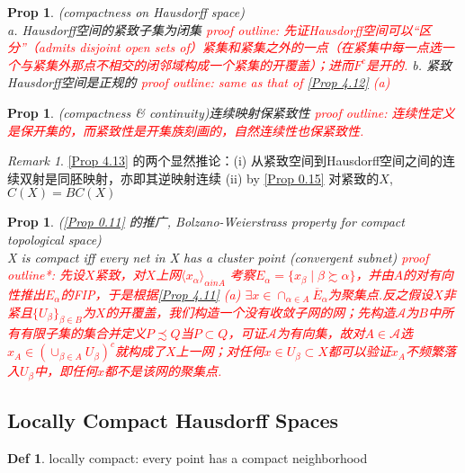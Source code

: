 \documentclass[hidelinks]{article}
\theoremstyle{definition}
\newtheorem*{defin}{Def}
\theoremstyle{plain}
\newtheorem{proposition}[theorem]{Prop}
\theoremstyle{remark}
\newtheorem*{remark}{Remark}
\begin{document}
\begin{proposition}\label{Prop 4.12}(compactness on Hausdorff space)~\\
a. Hausdorff空间的紧致子集为闭集\newline
\textcolor{red}{proof outline: 先证Hausdorff空间可以“区分”（admits disjoint open sets of）紧集和紧集之外的一点（在紧集中每一点选一个与紧集外那点不相交的闭邻域构成一个紧集的开覆盖）；进而$F^c$是开的.} \newline
b. 紧致Hausdorff空间是正规的 \newline
\textcolor{red}{proof outline: same as that of \autoref{Prop 4.12} (a)}
\end{proposition}

\begin{proposition}(compactness \& continuity)\label{Prop 4.13}
连续映射保紧致性\newline
\textcolor{red}{proof outline: 连续性定义是保开集的，而紧致性是开集族刻画的，自然连续性也保紧致性.}
\end{proposition}

\begin{remark}
\autoref{Prop 4.13} 的两个显然推论：(i) 从紧致空间到Hausdorff空间之间的连续双射是同胚映射，亦即其逆映射连续 (ii) by \autoref{Prop 0.15} 对紧致的$X$, $C(X)=BC(X)$
\end{remark}

\begin{proposition} (\autoref{Prop 0.11} 的推广, Bolzano-Weierstrass property for compact topological space)~\\
X is compact iff every net in X has a cluster point (convergent subnet) \newline
\textcolor{red}{proof outline*: 先设$X$紧致，对$X$上网$\langle x_\alpha \rangle_{\alpha in A}$ 考察$E_\alpha=\{x_\beta\mid \beta \succsim \alpha\}$，并由$A$的对有向性推出$E_\alpha$的FIP，于是根据\autoref{Prop 4.11} (a) $\exists x\in \cap_{\alpha \in A}\overline{E}_\alpha$为聚集点.\newline 反之假设$X$非紧且$\{U_\beta\}_{\beta \in B}$为$X$的开覆盖，我们构造一个没有收敛子网的网；先构造$\mathscr{A}$为$B$中所有有限子集的集合并定义$P\precsim Q$当$P\subset Q$，可证$\mathscr{A}$为有向集，故对$A\in \mathscr{A}$选$x_A\in (\cup_{\beta\in A}U_\beta)^c$就构成了$X$上一网；对任何$x\in U_\beta \subset X$都可以验证$x_A$不频繁落入$U_\beta$中，即任何$x$都不是该网的聚集点.}
\end{proposition}



\subsection{Locally Compact Hausdorff Spaces}
\begin{defin}
locally compact: every point has a compact neighborhood
\end{defin}
\end{document}
